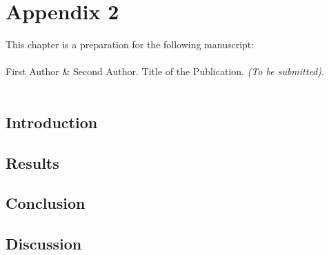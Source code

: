 \chapter{Appendix 2}

\label{appendix:appendix02}

\vspace{3cm}

This chapter is a preparation for the following manuscript:\\
\\
First Author \& 
Second Author. Title of the Publication. \textit{(To be submitted)}.\\
\\

\clearpage

\section{Introduction}
\lipsum[1-10]

\section{Results}
\lipsum[1-10]

\section{Conclusion}
\lipsum[1-10]

\section{Discussion}
\lipsum[1-10]
